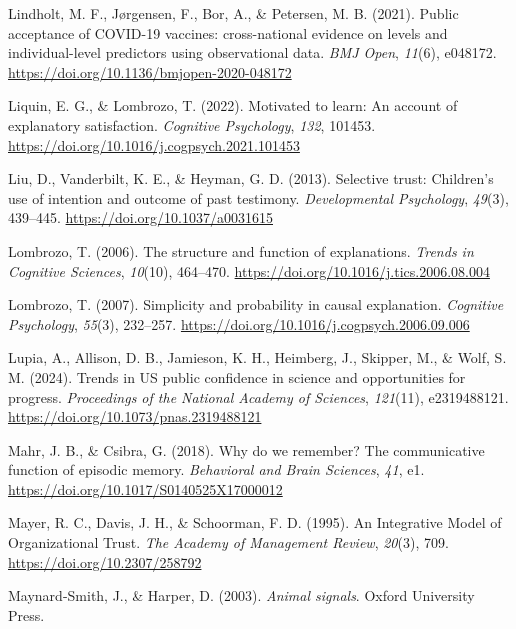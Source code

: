 \documentclass[
  jou,
  floatsintext,
  longtable,
  nolmodern,
  notxfonts,
  notimes,
  colorlinks=true,linkcolor=blue,citecolor=blue,urlcolor=blue]{apa7}
\newlength{\cslhangindent}
\newenvironment{CSLReferences}[2] %
 {\begin{list}{}{%
  \setlength{\itemindent}{0pt}
  \setlength{\leftmargin}{0pt}
  \setlength{\parsep}{0pt}
  \ifodd #1
   \setlength{\leftmargin}{\cslhangindent}
   \setlength{\itemindent}{-1\cslhangindent}
  \fi
  \setlength{\itemsep}{#2\baselineskip}}}
 {\end{list}}
\begin{document}
\begin{CSLReferences}{1}{0}
Lindholt, M. F., Jørgensen, F., Bor, A., \& Petersen, M. B. (2021).
Public acceptance of COVID-19 vaccines: cross-national evidence on
levels and individual-level predictors using observational data.
\emph{BMJ Open}, \emph{11}(6), e048172.
\url{https://doi.org/10.1136/bmjopen-2020-048172}

Liquin, E. G., \& Lombrozo, T. (2022). Motivated to learn: An account of
explanatory satisfaction. \emph{Cognitive Psychology}, \emph{132},
101453. \url{https://doi.org/10.1016/j.cogpsych.2021.101453}

Liu, D., Vanderbilt, K. E., \& Heyman, G. D. (2013). Selective trust:
Children's use of intention and outcome of past testimony.
\emph{Developmental Psychology}, \emph{49}(3), 439--445.
\url{https://doi.org/10.1037/a0031615}

Lombrozo, T. (2006). The structure and function of explanations.
\emph{Trends in Cognitive Sciences}, \emph{10}(10), 464--470.
\url{https://doi.org/10.1016/j.tics.2006.08.004}

Lombrozo, T. (2007). Simplicity and probability in causal explanation.
\emph{Cognitive Psychology}, \emph{55}(3), 232--257.
\url{https://doi.org/10.1016/j.cogpsych.2006.09.006}

Lupia, A., Allison, D. B., Jamieson, K. H., Heimberg, J., Skipper, M.,
\& Wolf, S. M. (2024). Trends in US public confidence in science and
opportunities for progress. \emph{Proceedings of the National Academy of
Sciences}, \emph{121}(11), e2319488121.
\url{https://doi.org/10.1073/pnas.2319488121}

Mahr, J. B., \& Csibra, G. (2018). Why do we remember? The communicative
function of episodic memory. \emph{Behavioral and Brain Sciences},
\emph{41}, e1. \url{https://doi.org/10.1017/S0140525X17000012}

Mayer, R. C., Davis, J. H., \& Schoorman, F. D. (1995). An Integrative
Model of Organizational Trust. \emph{The Academy of Management Review},
\emph{20}(3), 709. \url{https://doi.org/10.2307/258792}

Maynard-Smith, J., \& Harper, D. (2003). \emph{Animal signals}. Oxford
University Press.


\end{CSLReferences}
\end{document}
